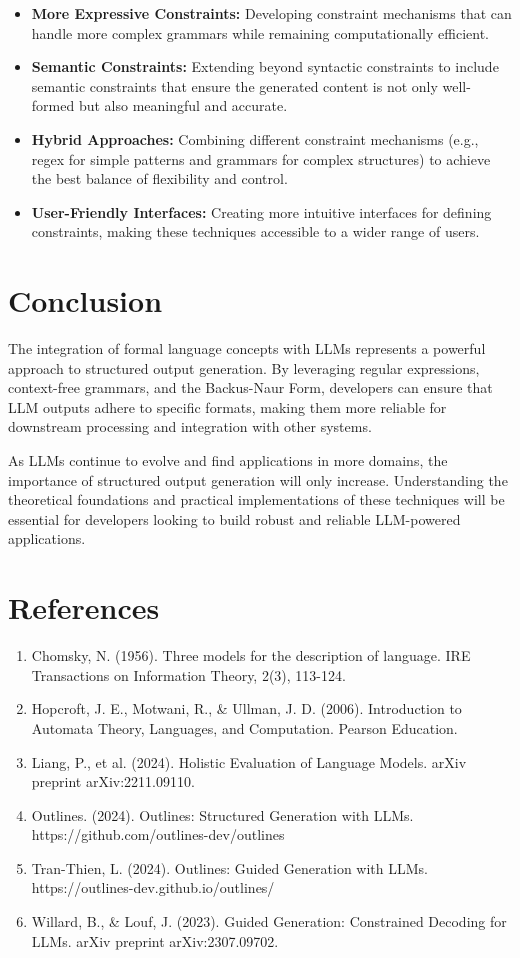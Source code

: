 \documentclass{article}
\begin{document}
\begin{itemize}
    \item \textbf{More Expressive Constraints:} Developing constraint mechanisms that can handle more complex grammars while remaining computationally efficient.
    \item \textbf{Semantic Constraints:} Extending beyond syntactic constraints to include semantic constraints that ensure the generated content is not only well-formed but also meaningful and accurate.
    \item \textbf{Hybrid Approaches:} Combining different constraint mechanisms (e.g., regex for simple patterns and grammars for complex structures) to achieve the best balance of flexibility and control.
    \item \textbf{User-Friendly Interfaces:} Creating more intuitive interfaces for defining constraints, making these techniques accessible to a wider range of users.
\end{itemize}

\section{Conclusion}

The integration of formal language concepts with LLMs represents a powerful approach to structured output generation. By leveraging regular expressions, context-free grammars, and the Backus-Naur Form, developers can ensure that LLM outputs adhere to specific formats, making them more reliable for downstream processing and integration with other systems.

As LLMs continue to evolve and find applications in more domains, the importance of structured output generation will only increase. Understanding the theoretical foundations and practical implementations of these techniques will be essential for developers looking to build robust and reliable LLM-powered applications.

\section{References}

\begin{enumerate}
    \item Chomsky, N. (1956). Three models for the description of language. IRE Transactions on Information Theory, 2(3), 113-124.
    \item Hopcroft, J. E., Motwani, R., & Ullman, J. D. (2006). Introduction to Automata Theory, Languages, and Computation. Pearson Education.
    \item Liang, P., et al. (2024). Holistic Evaluation of Language Models. arXiv preprint arXiv:2211.09110.
    \item Outlines. (2024). Outlines: Structured Generation with LLMs. https://github.com/outlines-dev/outlines
    \item Tran-Thien, L. (2024). Outlines: Guided Generation with LLMs. https://outlines-dev.github.io/outlines/
    \item Willard, B., & Louf, J. (2023). Guided Generation: Constrained Decoding for LLMs. arXiv preprint arXiv:2307.09702.
\end{enumerate}
\end{document}
